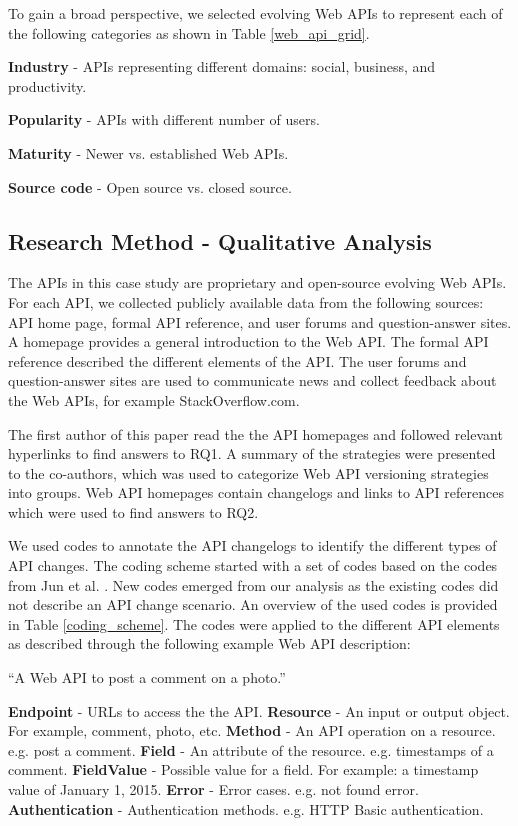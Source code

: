 To gain a broad perspective, we selected evolving Web APIs to represent each of the following categories as shown in Table \ref{web_api_grid}.

\textbf{Industry} - APIs representing different domains: social, business, and productivity.

\textbf{Popularity} - APIs with different number of users.

\textbf{Maturity} - Newer vs. established Web APIs.

\textbf{Source code} - Open source vs. closed source.


\subsection{Research Method - Qualitative Analysis} %
\label{sub:research_method}

The APIs in this case study are proprietary and open-source evolving Web APIs. For each API, we collected publicly available data from the following sources: API home page, formal API reference, and user forums and question-answer sites. A homepage provides a general introduction to the Web API. The formal API reference described the different elements of the API. The user forums and question-answer sites are used to communicate news and collect feedback about the Web APIs, for example StackOverflow.com.

The first author of this paper read the the API homepages and followed relevant hyperlinks to find answers to RQ1. A summary of the strategies were presented to the co-authors, which was used to categorize Web API versioning strategies into groups. Web API homepages contain changelogs and links to API references which were used to find answers to RQ2.

We used codes to annotate the API changelogs to identify the different types of API changes. The coding scheme started with a set of codes based on the codes from Jun et al. \cite{li_client_2013}. New codes  emerged from our analysis as the existing codes did not describe an API change scenario. An overview of the used codes is provided in Table \ref{coding_scheme}. The codes were applied to the different API elements as described through the following example Web API description:

``A Web API to post a comment on a photo.''

\textbf{Endpoint} - URLs to access the the API.
\textbf{Resource} - An input or output object. For example, comment, photo, etc.
\textbf{Method} - An API operation on a resource. e.g. post a comment.
\textbf{Field} - An attribute of the resource. e.g. timestamps of a comment.
\textbf{FieldValue} - Possible value for a field. For example: a timestamp value of January 1, 2015.
\textbf{Error} - Error cases. e.g. not found error.
\textbf{Authentication} - Authentication methods. e.g. HTTP Basic authentication.


